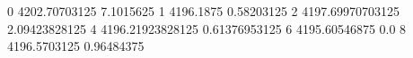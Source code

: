 0 4202.70703125 7.1015625
1 4196.1875 0.58203125
2 4197.69970703125 2.09423828125
4 4196.21923828125 0.61376953125
6 4195.60546875 0.0
8 4196.5703125 0.96484375

